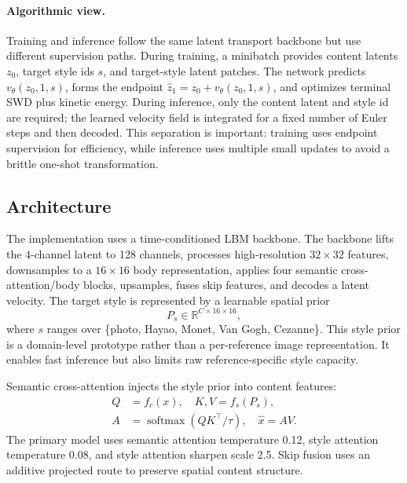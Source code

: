 ﻿\documentclass[letterpaper]{article}
\begin{document}
\paragraph{Algorithmic view.}
Training and inference follow the same latent transport backbone but use different supervision paths. During training, a minibatch provides content latents $z_0$, target style ids $s$, and target-style latent patches. The network predicts $v_\theta(z_0,1,s)$, forms the endpoint $\hat{z}_1=z_0+v_\theta(z_0,1,s)$, and optimizes terminal SWD plus kinetic energy. During inference, only the content latent and style id are required; the learned velocity field is integrated for a fixed number of Euler steps and then decoded. This separation is important: training uses endpoint supervision for efficiency, while inference uses multiple small updates to avoid a brittle one-shot transformation.

\subsection{Architecture}
The implementation uses a time-conditioned LBM backbone. The backbone lifts the $4$-channel latent to 128 channels, processes high-resolution $32 \times 32$ features, downsamples to a $16 \times 16$ body representation, applies four semantic cross-attention/body blocks, upsamples, fuses skip features, and decodes a latent velocity. The target style is represented by a learnable spatial prior
\begin{equation}
    P_s \in \mathbb{R}^{C \times 16 \times 16},
\end{equation}
where $s$ ranges over \{photo, Hayao, Monet, Van Gogh, Cezanne\}. This style prior is a domain-level prototype rather than a per-reference image representation. It enables fast inference but also limits raw reference-specific style capacity.

Semantic cross-attention injects the style prior into content features:
\begin{align}
    Q &= f_c(x), \quad K,V=f_s(P_s), \\
    A &= \operatorname{softmax}(QK^\top/\tau), \quad \hat{x}=AV .
\end{align}
The primary model uses semantic attention temperature 0.12, style attention temperature 0.08, and style attention sharpen scale 2.5. Skip fusion uses an additive projected route to preserve spatial content structure.
\end{document}
